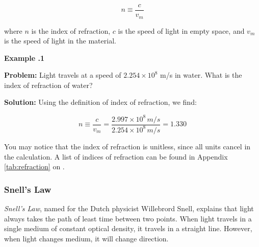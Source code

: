 	
		
	\begin{mdframed}[backgroundcolor=orange!20!white]
		
		\begin{equation}
		n \equiv \frac{c}{v_m}
		\label{equation:indexofrefraction}
		\end{equation}
	\end{mdframed}
 
 where $n$ is the index of refraction, $c$ is the speed of light in empty space, and $v_m$ is the speed of light in the material.  
 
 
 	\begin{mdframed}[backgroundcolor=blue!10!white]
 	\begin{center}	
 		\textbf{Example \thesection.1}	
 	\end{center}
 	
 	\textbf{Problem: } Light travels at a speed of $2.254 \times 10^8$ m/s in water.  What is the index of refraction of water? 
 	
 	\textbf{Solution:} Using the definition of index of refraction, we find:
 	
 	\begin{equation}
			n \equiv \frac{c}{v_m} = \frac{2.997 \times 10^8 \, \si{m/s}}{2.254 \times 10^8 \, \si{m/s}} = 1.330
 	\end{equation}
 \end{mdframed}
 
 You may notice that the index of refraction is unitless, since all units cancel in the calculation.   A list of indices of refraction can be found in Appendix \ref{tab:refraction} on  .
 
 
	
		\subsubsection{Snell's Law} 
		\textit{Snell's Law}, named for the Dutch physicist Willebrord Snell, explains that light always takes the path of least time between two points.  When light travels in a single medium of constant optical density, it travels in a straight line.  However, when light changes medium, it will change direction.  	
		

